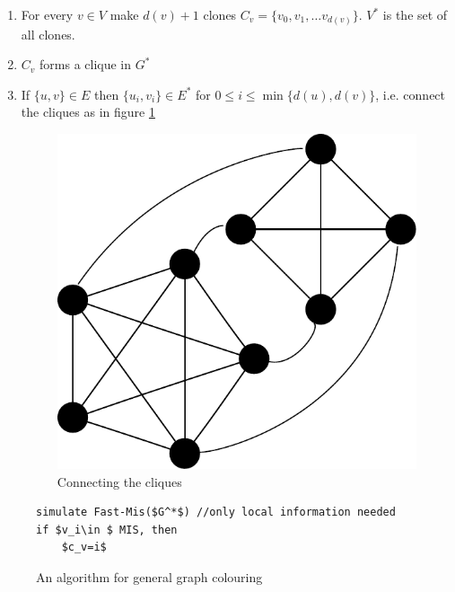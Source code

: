 \begin{enumerate}
\item For every $v\in V$ make $d(v)+1$ clones $C_v = \{v_0,v_1,\ldots v_{d(v)}\}$. $V^*$ is the set of all clones.
\item $C_v$ forms a clique in $G^*$
\item If $\{u,v\} \in E$ then $\{u_i,v_i\} \in E^*$ for $0\leq i \leq \min \{d(u),d(v)\}$, i.e. connect the cliques as in figure \ref{fig:colour_via_matching}

\begin{figure}
\begin{center}
\includegraphics[scale=0.7]{./images/colour_via_matching}
%
%		
%	
%	
\end{center}
\caption{Connecting the cliques}
\label{fig:colour_via_matching}
\end{figure}
\end{enumerate}

\begin{figure}[hbt]
\begin{lstlisting}
simulate Fast-Mis($G^*$) //only local information needed
if $v_i\in $ MIS, then
	$c_v=i$ 
\end{lstlisting}
\caption{An algorithm for general graph colouring}
\label{alg:general_colouring}
\end{figure}

